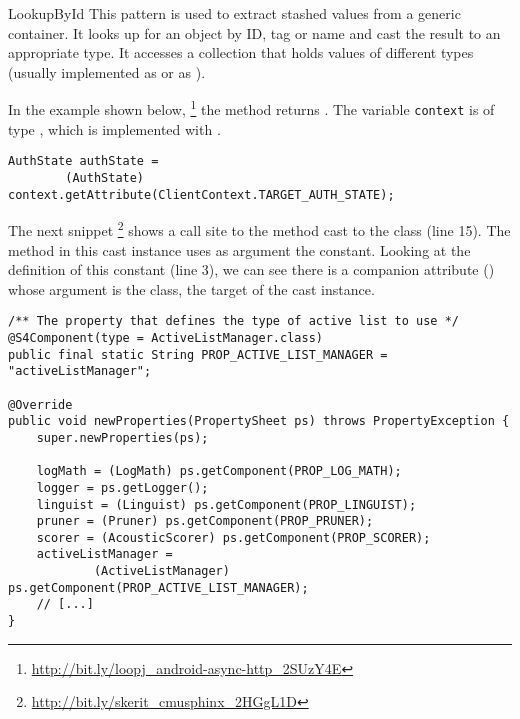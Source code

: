 \begin{pattern}{LookupById}
This pattern is used to extract stashed values from a generic container.
It looks up for an object by ID, tag or name and cast the result to an appropriate type.
It accesses a collection that holds values of different types
(usually implemented as  or as ).

\instances{}
In the example shown below,%
\footnote{\url{http://bit.ly/loopj_android-async-http_2SUzY4E}}
the  method returns .
The variable \texttt{context} is of type ,
which is implemented with .

\begin{verbatim}
AuthState authState =
        (AuthState) context.getAttribute(ClientContext.TARGET_AUTH_STATE);
\end{verbatim}

The next snippet%
\footnote{\url{http://bit.ly/skerit_cmusphinx_2HGgL1D}}
shows a call site to the  method cast to the  class (line 15).
The  method in this cast instance uses as argument the  constant.
Looking at the definition of this constant (line 3),
we can see there is a companion attribute () whose argument is the  class, the target of the cast instance.

\begin{verbatim}
/** The property that defines the type of active list to use */
@S4Component(type = ActiveListManager.class)
public final static String PROP_ACTIVE_LIST_MANAGER = "activeListManager";

@Override
public void newProperties(PropertySheet ps) throws PropertyException {
    super.newProperties(ps);
    
    logMath = (LogMath) ps.getComponent(PROP_LOG_MATH);
    logger = ps.getLogger();
    linguist = (Linguist) ps.getComponent(PROP_LINGUIST);
    pruner = (Pruner) ps.getComponent(PROP_PRUNER);
    scorer = (AcousticScorer) ps.getComponent(PROP_SCORER);
    activeListManager = 
            (ActiveListManager) ps.getComponent(PROP_ACTIVE_LIST_MANAGER);
    // [...]
}
\end{verbatim}



\end{pattern}
